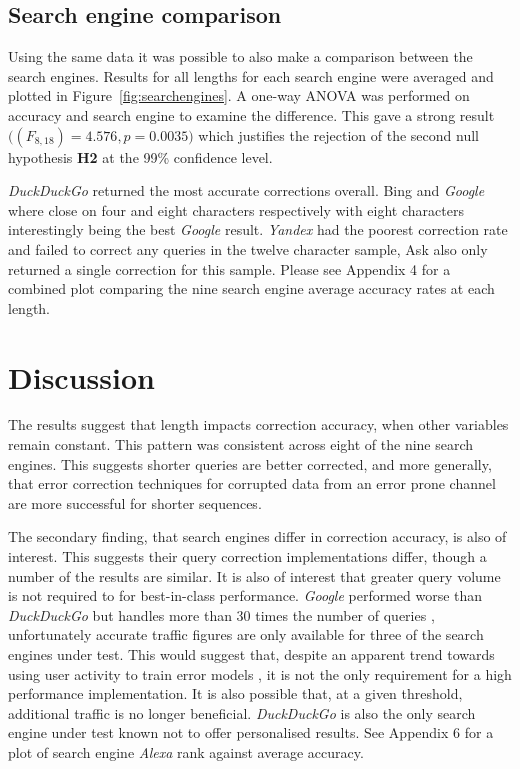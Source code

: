 \documentclass{csfourzero}
\begin{document}
\subsection{Search engine comparison}
Using the same data it was possible to also make a comparison between the search engines. Results for all lengths for each search engine were averaged and plotted in Figure~\ref{fig:searchengines}. A one-way ANOVA was performed on accuracy and search engine to examine the difference. This gave a strong result $\big((F_{8,18}) = 4.576, p = 0.0035\big)$ which justifies the rejection of the second null hypothesis \textbf{H2} at the 99\% confidence level.

\textit{DuckDuckGo} returned the most accurate corrections overall. Bing and \textit{Google} where close on four and eight characters respectively with eight characters interestingly being the best \textit{Google} result. \textit{Yandex} had the poorest correction rate and failed to correct any queries in the twelve character sample, Ask also only returned a single correction for this sample. Please see Appendix 4 for a combined plot comparing the nine search engine average accuracy rates at each length.

\section{Discussion}
\label{sec:discuss}

The results suggest that length impacts correction accuracy, when other variables remain constant. This pattern was consistent across eight of the nine search engines. This suggests shorter queries are better corrected, and more generally, that error correction techniques for corrupted data from an error prone channel are more successful for shorter sequences.

The secondary finding, that search engines differ in correction accuracy, is also of interest. This suggests their query correction implementations differ, though a number of the results are similar. It is also of interest that greater query volume is not required to for best-in-class performance. \textit{Google} performed worse than \textit{DuckDuckGo} but handles more than 30 times the number of queries \cite{enginecomparewiki}, unfortunately accurate traffic figures are only available for three of the search engines under test. This would suggest that, despite an apparent trend towards using user activity to train error models \cite{webuserpoweredspelling, webuser3, webuser2learningerrormodel, webuser4google2009}, it is not the only requirement for a high performance implementation. It is also possible that, at a given threshold, additional traffic is no longer beneficial. \textit{DuckDuckGo} is also the only search engine under test known not to offer personalised results. See Appendix 6 for a plot of search engine \textit{Alexa} rank against average accuracy.
\end{document}
